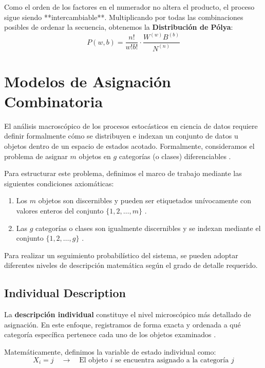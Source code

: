 Como el orden de los factores en el numerador no altera el producto, el proceso sigue siendo **intercambiable**. Multiplicando por todas las combinaciones posibles de ordenar la secuencia, obtenemos la \textbf{Distribución de Pólya}:
\begin{equation}
    P(w, b) = \frac{n!}{w!b!} \cdot \frac{W^{(w)} B^{(b)}}{N^{(n)}}
\end{equation}


\section{Modelos de Asignación Combinatoria}

El análisis macroscópico de los procesos estocásticos en ciencia de datos requiere definir formalmente cómo se distribuyen e indexan un conjunto de datos u objetos dentro de un espacio de estados acotado. Formalmente, consideramos el problema de asignar $m$ objetos en $g$ categorías (o clases) diferenciables .

Para estructurar este problema, definimos el marco de trabajo mediante las siguientes condiciones axiomáticas:
\begin{enumerate}
    \item Los $m$ objetos son discernibles y pueden ser etiquetados unívocamente con valores enteros del conjunto $\{1, 2, \dots, m\}$ .
    \item Las $g$ categorías o clases son igualmente discernibles y se indexan mediante el conjunto $\{1, 2, \dots, g\}$ .
\end{enumerate}

Para realizar un seguimiento probabilístico del sistema, se pueden adoptar diferentes niveles de descripción matemática según el grado de detalle requerido.

\subsection{Individual Description}

La \textbf{descripción individual} constituye el nivel microscópico más detallado de asignación. En este enfoque, registramos de forma exacta y ordenada a qué categoría específica pertenece cada uno de los objetos examinados .

Matemáticamente, definimos la variable de estado individual como:
\begin{equation}
    X_i = j \quad \longrightarrow \quad \text{El objeto $i$ se encuentra asignado a la categoría $j$} 
\end{equation}


